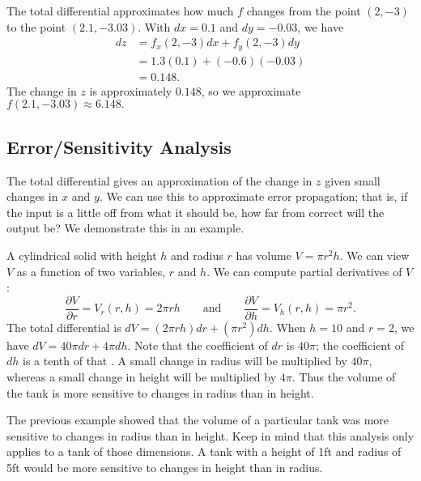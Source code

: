 {The total differential approximates how much $f$ changes from the point $(2,-3)$ to the point $(2.1,-3.03)$. With $dx = 0.1$ and $dy = -0.03$, we have
\begin{align*}
dz &= f_x(2,-3)dx + f_y(2,-3)dy\\
		&= 1.3(0.1) + (-0.6)(-0.03) \\
		&= 0.148.
\end{align*}
The change in $z$ is approximately $0.148$, so we approximate $f(2.1,-3.03)\approx 6.148.$}

\subsection{Error/Sensitivity Analysis}

The total differential gives an approximation of the change in $z$ given small changes in $x$ and $y$. We can use this to approximate error propagation; that is, if the input is a little off from what it should be, how far from correct will the output be? We demonstrate this in an example.

{A cylindrical solid with height $h$ and radius $r$ has volume $V = \pi r^2h$. We can view $V$ as a function of two variables, $r$ and $h$. We can compute partial derivatives of $V$:
\[\frac{\partial V}{\partial r} = V_r(r,h) = 2\pi rh \qquad \text{and}\qquad \frac{\partial V}{\partial h} = V_h(r,h) = \pi r^2.\]
The total differential is $dV = (2\pi rh)dr + (\pi r^2)dh.$ When $h = 10$ and $r = 2$, we have $dV = 40\pi dr + 4\pi dh$.
Note that the coefficient of $dr$ is $40\pi%
$; the coefficient of $dh$ is a tenth of that%
. A small change in radius will be multiplied by $40\pi$, whereas a small change in height will be multiplied by $4\pi$. Thus the volume of the tank is more sensitive to changes in radius than in height.}

The previous example showed that the volume of a particular tank was more sensitive to changes in radius than in height. Keep in mind that this analysis only applies to a tank of those dimensions. A tank with a height of 1ft and radius of 5ft would be more sensitive to changes in height than in radius.

